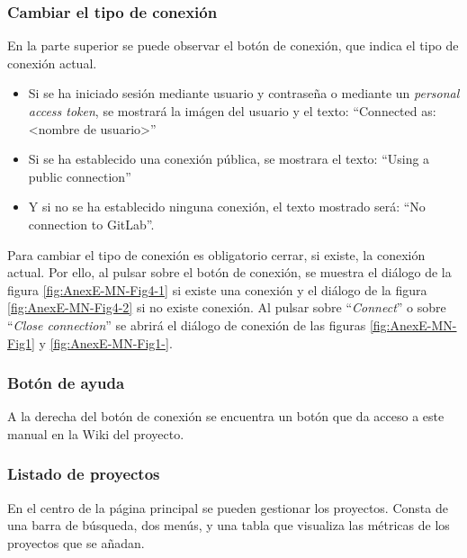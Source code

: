 \subsubsection{Cambiar el tipo de conexión}
En la parte superior se puede observar el botón de conexión, que indica el tipo de conexión actual.
\begin{itemize}
	\tightlist
	\item Si se ha iniciado sesión mediante usuario y contraseña o mediante un \textit{personal access token}, se mostrará la imágen del usuario y el texto: ``Connected as: <nombre de usuario>''
	\item Si se ha establecido una conexión pública, se mostrara el texto: ``Using a public connection''
	\item Y si no se ha establecido ninguna conexión, el texto mostrado será: ``No connection to GitLab''.
\end{itemize}
Para cambiar el tipo de conexión es obligatorio cerrar, si existe, la conexión actual. Por ello, al pulsar sobre el botón de conexión, se muestra el diálogo de la figura \ref{fig:AnexE-MN-Fig4-1} si existe una conexión y el diálogo de la figura \ref{fig:AnexE-MN-Fig4-2} si no existe conexión. Al pulsar sobre ``\textit{Connect}'' o sobre ``\textit{Close connection}'' se abrirá el diálogo de conexión de las figuras \ref{fig:AnexE-MN-Fig1} y \ref{fig:AnexE-MN-Fig1-}.
\subsubsection{Botón de ayuda}
A la derecha del botón de conexión se encuentra un botón que da acceso a este manual en la Wiki del proyecto.
\subsubsection{Listado de proyectos}
En el centro de la página principal se pueden gestionar los proyectos. Consta de una barra de búsqueda, dos menús, y una tabla que visualiza las métricas de los proyectos que se añadan.

